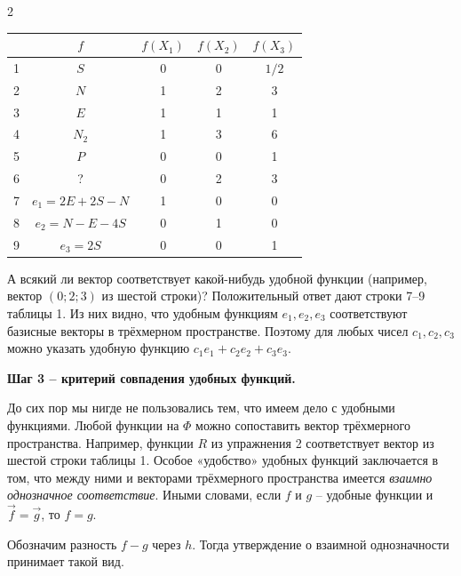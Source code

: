\documentclass[12pt]{article} %
\newcommand{\magentaTitle}[1]{\noindent\textcolor[rgb]{0.99,0.05,0.75}{\textbf{#1}}} %
\begin{document}
\begin{paracol}{2}
\begin{leftcolumn}
\small
\setlength{\tabcolsep}{4pt}    %
\renewcommand{\arraystretch}{1.02} %
\begin{center}
\begin{tabular}{|c|c|c|c|c|} %
  \hline
  & $f$ & $f(X_1)$ & $f(X_2)$ & $f(X_3)$ \\ \hline
  1 & $S$ & 0 & 0 & $1/2$ \\ \hline
  2 & $N$ & 1 & 2 & 3 \\ \hline
  3 & $E$ & 1 & 1 & 1 \\ \hline
  4 & $N_2$ & 1 & 3 & 6 \\ \hline
  5 & $P$ & 0 & 0 & 1 \\ \hline
  6 & ? & 0 & 2 & 3 \\ \hline
  7 & $e_1=2E+2S-N$ & 1 & 0 & 0 \\ \hline
  8 & $e_2=N-E-4S$ & 0 & 1 & 0 \\ \hline
  9 & $e_3=2S$ & 0 & 0 & 1 \\ \hline
\end{tabular}
\end{center}
\normalsize

\end{leftcolumn}

\switchcolumn %


А всякий ли вектор соответствует какой-нибудь удобной функции (например, вектор $(0;2;3)$ из шестой строки)? Положительный ответ дают строки 7--9 таблицы 1. Из них видно, что удобным функциям $e_1,e_2,e_3$ соответствуют базисные векторы в трёхмерном пространстве. Поэтому для любых чисел $c_1,c_2,c_3$ можно указать удобную функцию $c_1e_1+c_2e_2+c_3e_3$.

\bigskip

\magentaTitle{Шаг 3 -- критерий совпадения удобных функций.} %

До сих пор мы нигде не пользовались тем, что имеем дело с удобными функциями. Любой функции на $\Phi$ можно сопоставить вектор трёхмерного пространства. Например, функции $R$ из упражнения 2 соответствует вектор из шестой строки таблицы 1. Особое «удобство» удобных функций заключается в том, что между ними и векторами трёхмерного пространства имеется \textit{взаимно однозначное соответствие}. Иными словами, если $f$ и $g$ -- удобные функции и $\vec f=\vec g$, то $f=g$.

Обозначим разность $f-g$ через $h$. Тогда утверждение о взаимной однозначности принимает такой вид.


\end{paracol}
\end{document}
